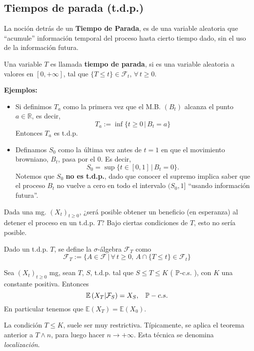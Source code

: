 \subsection{Tiempos de parada (t.d.p.)}
La noción detrás de un \textbf{Tiempo de Parada}, es de una variable aleatoria que ``acumule'' información temporal del proceso hasta cierto tiempo dado, sin el uso de la información futura.
\begin{definicion}
Una variable $T$ es llamada \textbf{tiempo de parada}, si es una variable aleatoria a valores en $[0,+\infty]$, tal que $\{T \leq t\} \in \mathcal{F}_t$, $\forall\,t\geq 0$.
\label{def_tdp}
\end{definicion}
\textbf{Ejemplos:}
\begin{itemize}
    \item Si definimos $T_a$ como la primera vez que el M.B. $(B_t)$ alcanza el punto $a\in \mathbb{R}$, es decir,
    \begin{equation}
        T_a := \inf\{t\geq 0\,|\,B_t = a\}
        \label{time_a}
    \end{equation}
    Entonces $T_a$ es t.d.p.
    \item Definamos $S_0$ como la última vez antes de $t=1$ en que el movimiento browniano, $B_t$, pasa por el $0$. Es decir,
    \[S_0 =\sup\{t \in [0,1]\,|\,B_t=0\}.\]
    Notemos que $S_0$ \textbf{no es t.d.p.}, dado que conocer el supremo implica saber que el proceso $B_t$ no vuelve a cero en todo el intervalo $(S_0,1]$ ``usando información futura''.
\end{itemize}
Dada una mg. $(X_t)_{t\geq0}$, ¿será posible obtener un beneficio (en esperanza) al detener el proceso en un t.d.p. $T$? Bajo ciertas condiciones de $T$, esto no sería posible.
\newline

Dado un t.d.p. $T$, se define la $\sigma$-álgebra $\mathcal{F}_T$ como
\[\mathcal{F}_T := \{A \in \mathcal{F}\,|\,\forall\,t\geq 0,\,A\cap\{T\leq t\} \in \mathcal{F}_t\}\]

\begin{teorema}
Sea $(X_t)_{t\geq0}$ mg, sean $T$, $S$, t.d.p. tal que $S\leq T \leq K$ ( $\mathbb{P}$-c.s. ), con $K$ una constante positiva. Entonces
\[\mathbb{E}\left(X_T|\mathcal{F}_S\right) = X_S,\hspace{0.3cm}\mathbb{P}-c.s.\] 
En particular tenemos que $\mathbb{E}(X_T) = \mathbb{E}(X_0)$.
\label{Doob}
\end{teorema}

La condición $T\leq K$, suele ser muy restrictiva. Típicamente, se aplica el teorema anterior  a $T\wedge n$, para luego hacer $n \rightarrow +\infty$. Esta técnica se denomina \textit{localización}. 

